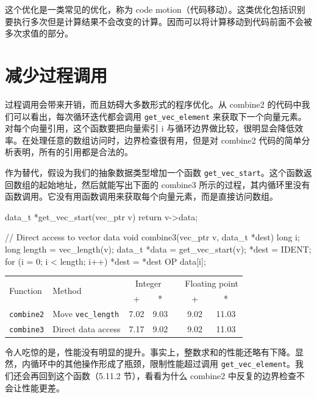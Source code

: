 这个优化是一类常见的优化，称为 code motion（代码移动）。这类优化包括识别要执行多次但是计算结果不会改变的计算。因而可以将计算移动到代码前面不会被多次求值的部分。

\section{减少过程调用}

过程调用会带来开销，而且妨碍大多数形式的程序优化。从 combine2 的代码中我们可以看出，每次循环迭代都会调用 \verb|get_vec_element| 来获取下一个向量元素。对每个向量引用，这个函数要把向量索引 i 与循环边界做比较，很明显会降低效率。在处理任意的数组访问时，边界检查很有用，但是对 combine2 代码的简单分析表明，所有的引用都是合法的。

作为替代，假设为我们的抽象数据类型增加一个函数 \verb|get_vec_start|。这个函数返回数组的起始地址，然后就能写出下面的 combine3 所示的过程，其内循环里没有函数调用。它没有用函数调用来获取每个向量元素，而是直接访问数组。

\begin{cppcode}
data_t *get_vec_start(vec_ptr v) {
  return v->data;
}
\end{cppcode}

\begin{cppcode}
// Direct access to vector data
void combine3(vec_ptr v, data_t *dest) {
  long i;
  long length = vec_length(v);
  data_t *data = get_vec_start(v);
  *dest = IDENT;
  for (i = 0; i < length; i++) {
    *dest = *dest OP data[i];
  }
}
\end{cppcode}

\begin{table}[!ht]
    \centering
    \begin{tabular}{llccccc}
        \toprule
         \multirow{2}{*}{Function} & \multirow{2}{*}{Method} & \multicolumn{2}{c}{Integer} & & \multicolumn{2}{c}{Floating point} \\
         \cmidrule{3-4}
         \cmidrule{6-7}
          & & + & * & & + & * \\
         \midrule
         \texttt{combine2} & Move \texttt{vec\_length} & 7.02 & 9.03 & & 9.02 & 11.03 \\
         \texttt{combine3} & Direct data access & 7.17 & 9.02 & & 9.02 & 11.03 \\
         \bottomrule
    \end{tabular}
\end{table}

令人吃惊的是，性能没有明显的提升。事实上，整数求和的性能还略有下降。显然，内循环中的其他操作形成了瓶颈，限制性能超过调用 \verb|get_vec_element|。我们还会再回到这个函数（5.11.2 节），看看为什么 combine2 中反复的边界检查不会让性能更差。

